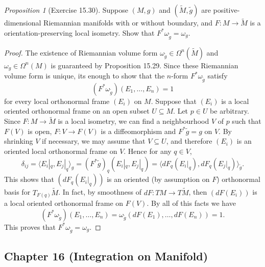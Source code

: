 \documentclass[a4paper]{article}
\theoremstyle{remark}
\newtheorem{prop}{Proposition}
\newcommand{\subhim}{\subseteq} %
\newcommand\metric[1]{\langle#1\rangle}
\newcommand\wtilde[1]{\widetilde{#1}} %
\begin{document}
\begin{prop}[Exercise 15.30]
Suppose $(M,g)$ and $(\wtilde{M},\wtilde{g})$ are positive-dimensional Riemannian manifolds with or without boundary, and $F : M \to \wtilde{M}$ is a orientation-preserving local isometry. Show that $F^*\omega_{\wtilde{g}} = \omega_g$. 
\end{prop}
\begin{proof}
The existence of Riemannian volume form $\omega_{\wtilde{g}} \in \Omega^n(\wtilde{M})$ and $\omega_g \in \Omega^n(M)$ is guaranteed by Proposition 15.29. Since these Riemannian volume form is unique, its enough to show that the $n$-form $F^*\omega_{\wtilde{g}}$ satisfy
$$
(F^*\omega_{\wtilde{g}}) (E_1,\dots,E_n) =1
$$
for every local orthonormal frame $(E_i)$ on $M$. Suppose that $(E_i)$ is a local oriented orthonormal frame on an open subset $U \subhim M$. Let $p \in U$ be arbitrary. Since $F : M \to \wtilde{M}$ is a local isometry, we can find a neighbourhood $V$ of $p$ such that $F(V)$ is open, $F : V \to F(V)$ is a diffeomorphism and $F^*\wtilde{g}=g$ on $V$. By shrinking $V$ if necessary, we may assume that $V \subhim U$, and therefore $(E_i)$ is an oriented local orthonormal frame on $V$. Hence for any $q \in V$,
$$
\delta_{ij} = \metric{E_i|_q,E_j|_q}_g = (F^*\wtilde{g})_q(E_i|_q,E_j|_q) = \metric{dF_q(E_i|_q),dF_q(E_j|_q)}_{\wtilde{g}}.
$$
This shows that $(dF_q(E_i|_q))$ is an oriented (by assumption on $F$) orthonormal basis for $T_{F(q)}\wtilde{M}$. In fact, by smoothness of $dF :TM \to T\wtilde{M}$, then $(dF(E_i))$ is a local oriented orthonormal frame on $F(V)$. By all of this facts we have
$$
(F^*\omega_{\wtilde{g}})(E_1,\dots,E_n) = \omega_{\wtilde{g}} (dF(E_1),\dots,dF(E_n)) = 1. 
$$
This proves that $F^*\omega_{\wtilde{g}} = \omega_{g}$. 
\end{proof}

\subsection{Chapter 16 (Integration on Manifold)}
\end{document}
